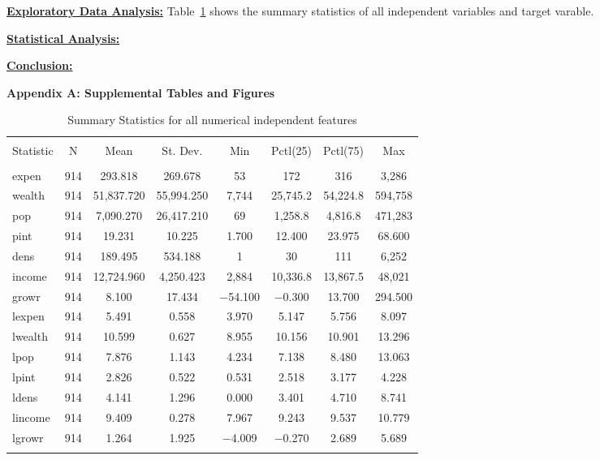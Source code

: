 \documentclass[11pt]{article}\usepackage[]{graphicx}\usepackage[]{color}
\begin{document}
\noindent\textbf{\underline{Exploratory Data Analysis:}} Table~\ref{descrips} shows the summary statistics of all independent variables and target varable.
\hfill \break

\noindent\textbf{\underline{Statistical Analysis:}}
\hfill \break

\noindent\textbf{\underline{Conclusion:}}
\hfill \break


\clearpage
\newpage
\noindent \Large{{\bf Appendix A: Supplemental Tables and Figures}}

\begin{center}

\begin{table}[H] \centering 
  \caption{Summary Statistics for all numerical independent features} 
  \label{descrips} 
\begin{tabular}{@{\extracolsep{5pt}}lccccccc} 
\\[-1.8ex]\hline 
\hline \\[-1.8ex] 
Statistic & \multicolumn{1}{c}{N} & \multicolumn{1}{c}{Mean} & \multicolumn{1}{c}{St. Dev.} & \multicolumn{1}{c}{Min} & \multicolumn{1}{c}{Pctl(25)} & \multicolumn{1}{c}{Pctl(75)} & \multicolumn{1}{c}{Max} \\ 
\hline \\[-1.8ex] 
expen & 914 & 293.818 & 269.678 & 53 & 172 & 316 & 3,286 \\ 
wealth & 914 & 51,837.720 & 55,994.250 & 7,744 & 25,745.2 & 54,224.8 & 594,758 \\ 
pop & 914 & 7,090.270 & 26,417.210 & 69 & 1,258.8 & 4,816.8 & 471,283 \\ 
pint & 914 & 19.231 & 10.225 & 1.700 & 12.400 & 23.975 & 68.600 \\ 
dens & 914 & 189.495 & 534.188 & 1 & 30 & 111 & 6,252 \\ 
income & 914 & 12,724.960 & 4,250.423 & 2,884 & 10,336.8 & 13,867.5 & 48,021 \\ 
growr & 914 & 8.100 & 17.434 & $-$54.100 & $-$0.300 & 13.700 & 294.500 \\ 
lexpen & 914 & 5.491 & 0.558 & 3.970 & 5.147 & 5.756 & 8.097 \\ 
lwealth & 914 & 10.599 & 0.627 & 8.955 & 10.156 & 10.901 & 13.296 \\ 
lpop & 914 & 7.876 & 1.143 & 4.234 & 7.138 & 8.480 & 13.063 \\ 
lpint & 914 & 2.826 & 0.522 & 0.531 & 2.518 & 3.177 & 4.228 \\ 
ldens & 914 & 4.141 & 1.296 & 0.000 & 3.401 & 4.710 & 8.741 \\ 
lincome & 914 & 9.409 & 0.278 & 7.967 & 9.243 & 9.537 & 10.779 \\ 
lgrowr & 914 & 1.264 & 1.925 & $-$4.009 & $-$0.270 & 2.689 & 5.689 \\ 
\hline \\[-1.8ex] 
\end{tabular} 
\end{table} 

\end{center} 
\end{document}
